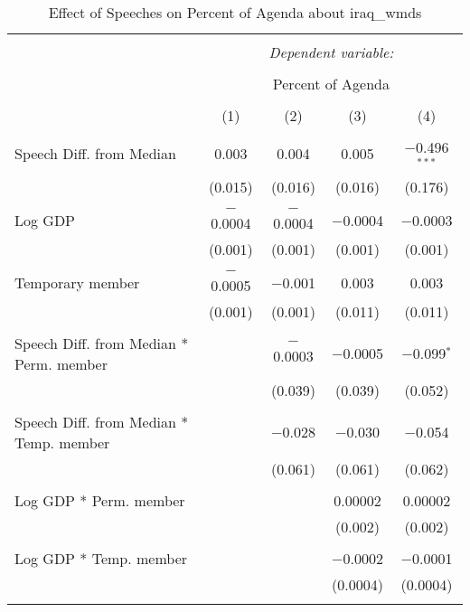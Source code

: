 
\begin{table}[!htbp] \centering 
  \caption{Effect of Speeches on Percent of Agenda about iraq_wmds} 
  \label{} 
\begin{tabular}{@{\extracolsep{5pt}}lcccc} 
\\[-1.8ex]\hline 
\hline \\[-1.8ex] 
 & \multicolumn{4}{c}{\textit{Dependent variable:}} \\ 
\cline{2-5} 
\\[-1.8ex] & \multicolumn{4}{c}{Percent of Agenda} \\ 
\\[-1.8ex] & (1) & (2) & (3) & (4)\\ 
\hline \\[-1.8ex] 
 Speech Diff. from Median & 0.003 & 0.004 & 0.005 & $-$0.496$^{***}$ \\ 
  & (0.015) & (0.016) & (0.016) & (0.176) \\ 
  & & & & \\ 
 Log GDP & $-$0.0004 & $-$0.0004 & $-$0.0004 & $-$0.0003 \\ 
  & (0.001) & (0.001) & (0.001) & (0.001) \\ 
  & & & & \\ 
 Temporary member & $-$0.0005 & $-$0.001 & 0.003 & 0.003 \\ 
  & (0.001) & (0.001) & (0.011) & (0.011) \\ 
  & & & & \\ 
 Speech Diff. from Median * Perm. member &  & $-$0.0003 & $-$0.0005 & $-$0.099$^{*}$ \\ 
  &  & (0.039) & (0.039) & (0.052) \\ 
  & & & & \\ 
 Speech Diff. from Median * Temp. member &  & $-$0.028 & $-$0.030 & $-$0.054 \\ 
  &  & (0.061) & (0.061) & (0.062) \\ 
  & & & & \\ 
 Log GDP * Perm. member &  &  & 0.00002 & 0.00002 \\ 
  &  &  & (0.002) & (0.002) \\ 
  & & & & \\ 
 Log GDP * Temp. member &  &  & $-$0.0002 & $-$0.0001 \\ 
  &  &  & (0.0004) & (0.0004) \\ 
  & & & & \\ 

\end{tabular}
\end{table}
